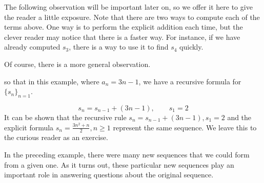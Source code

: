 \documentclass{ximera}
\begin{document}
\begin{remark} 
The following observation will be important later on, so we offer it here to give the reader a little exposure.  Note that there are two ways to compute each of the terms above.  One way is to perform the explicit addition each time, but the clever reader may notice that there is a faster way.  For instance, if we have already computed $s_3$, there is a way to use it to find $s_4$ quickly.


\begin{image}
  \end{image}

Of course, there is a more general observation.

\begin{image}
  \end{image}




so that in this example, where $a_n = 3n-1$, we have a recursive formula for $\{s_n\}_{n=1}$.

\[
s_n = s_{n-1} + (3n-1), \qquad s_1 =2
\]  
It can be shown that the recursive rule $s_n = s_{n-1} + (3n-1), s_1
=2$ and the explicit formula $s_n = \frac{3n^2+n}{2} , n \geq 1$
represent the same sequence.  We leave this to the curious reader as
an exercise.    
\end{remark}

In the preceding example, there were many new sequences that we could form from a given one.  As it turns out, these particular new sequences play an important role in answering questions about the original sequence.  
\end{document}
